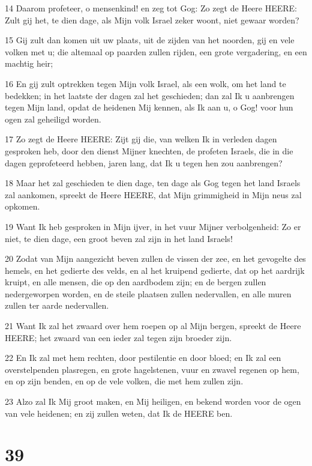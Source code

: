 \par 14 Daarom profeteer, o mensenkind! en zeg tot Gog: Zo zegt de Heere HEERE: Zult gij het, te dien dage, als Mijn volk Israel zeker woont, niet gewaar worden?
\par 15 Gij zult dan komen uit uw plaats, uit de zijden van het noorden, gij en vele volken met u; die altemaal op paarden zullen rijden, een grote vergadering, en een machtig heir;
\par 16 En gij zult optrekken tegen Mijn volk Israel, als een wolk, om het land te bedekken; in het laatste der dagen zal het geschieden; dan zal Ik u aanbrengen tegen Mijn land, opdat de heidenen Mij kennen, als Ik aan u, o Gog! voor hun ogen zal geheiligd worden.
\par 17 Zo zegt de Heere HEERE: Zijt gij die, van welken Ik in verleden dagen gesproken heb, door den dienst Mijner knechten, de profeten Israels, die in die dagen geprofeteerd hebben, jaren lang, dat Ik u tegen hen zou aanbrengen?
\par 18 Maar het zal geschieden te dien dage, ten dage als Gog tegen het land Israels zal aankomen, spreekt de Heere HEERE, dat Mijn grimmigheid in Mijn neus zal opkomen.
\par 19 Want Ik heb gesproken in Mijn ijver, in het vuur Mijner verbolgenheid: Zo er niet, te dien dage, een groot beven zal zijn in het land Israels!
\par 20 Zodat van Mijn aangezicht beven zullen de vissen der zee, en het gevogelte des hemels, en het gedierte des velds, en al het kruipend gedierte, dat op het aardrijk kruipt, en alle mensen, die op den aardbodem zijn; en de bergen zullen nedergeworpen worden, en de steile plaatsen zullen nedervallen, en alle muren zullen ter aarde nedervallen.
\par 21 Want Ik zal het zwaard over hem roepen op al Mijn bergen, spreekt de Heere HEERE; het zwaard van een ieder zal tegen zijn broeder zijn.
\par 22 En Ik zal met hem rechten, door pestilentie en door bloed; en Ik zal een overstelpenden plasregen, en grote hagelstenen, vuur en zwavel regenen op hem, en op zijn benden, en op de vele volken, die met hem zullen zijn.
\par 23 Alzo zal Ik Mij groot maken, en Mij heiligen, en bekend worden voor de ogen van vele heidenen; en zij zullen weten, dat Ik de HEERE ben.

\chapter{39}

